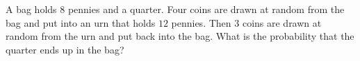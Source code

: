 A bag holds $8$ pennies and a quarter. Four coins are drawn at random from the bag and put into an urn that holds $12$ pennies. Then $3$ coins are drawn at random from the urn and put back into the bag. What is the probability that the quarter ends up in the bag?
